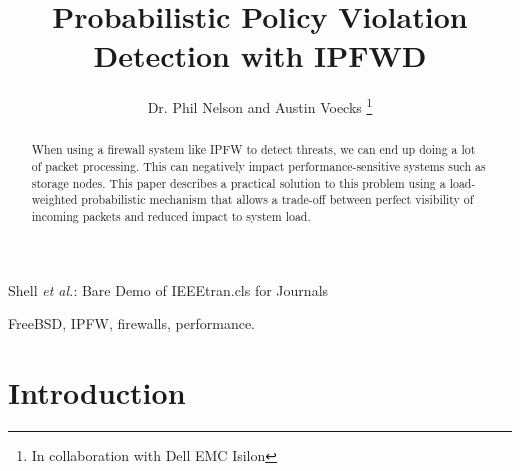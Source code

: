 \documentclass[journal]{IEEEtran}
\begin{document}
%
\title{Probabilistic Policy Violation Detection with IPFWD}

\author{Dr. Phil Nelson and Austin Voecks%
\thanks{In collaboration with Dell EMC Isilon}}


%
{Shell \MakeLowercase{\textit{et al.}}: Bare Demo of IEEEtran.cls for Journals}
% 


\maketitle


\begin{abstract}
When using a firewall system like IPFW to detect threats, we can end up doing a
lot of packet processing. This can negatively impact performance-sensitive
systems such as storage nodes. This paper describes a practical solution to
this problem using a load-weighted probabilistic mechanism that allows a
trade-off between perfect visibility of incoming packets and reduced impact to
system load.  

\end{abstract}


\begin{IEEEkeywords}
FreeBSD, IPFW, firewalls, performance.
\end{IEEEkeywords}


%
\IEEEpeerreviewmaketitle


\section{Introduction}
\end{document}
